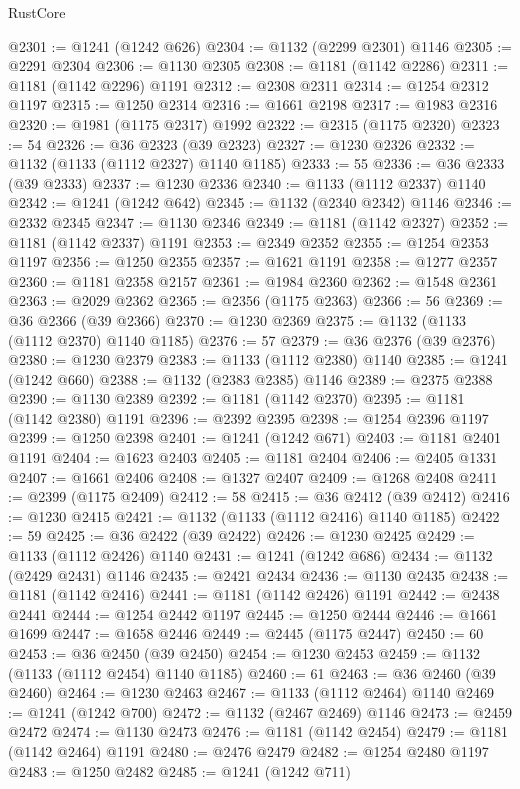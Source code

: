 \begin{lexlean}{RustCore}
\begin{coremodule}
@2301 := @1241 (@1242 @626)
@2304 := @1132 (@2299 @2301) @1146
@2305 := @2291 @2304
@2306 := @1130 @2305
@2308 := @1181 (@1142 @2286)
@2311 := @1181 (@1142 @2296) @1191
@2312 := @2308 @2311
@2314 := @1254 @2312 @1197
@2315 := @1250 @2314
@2316 := @1661 @2198
@2317 := @1983 @2316
@2320 := @1981 (@1175 @2317) @1992
@2322 := @2315 (@1175 @2320)
@2323 := 54
@2326 := @36 @2323 (@39 @2323)
@2327 := @1230 @2326
@2332 := @1132 (@1133 (@1112 @2327) @1140 @1185)
@2333 := 55
@2336 := @36 @2333 (@39 @2333)
@2337 := @1230 @2336
@2340 := @1133 (@1112 @2337) @1140
@2342 := @1241 (@1242 @642)
@2345 := @1132 (@2340 @2342) @1146
@2346 := @2332 @2345
@2347 := @1130 @2346
@2349 := @1181 (@1142 @2327)
@2352 := @1181 (@1142 @2337) @1191
@2353 := @2349 @2352
@2355 := @1254 @2353 @1197
@2356 := @1250 @2355
@2357 := @1621 @1191
@2358 := @1277 @2357
@2360 := @1181 @2358 @2157
@2361 := @1984 @2360
@2362 := @1548 @2361
@2363 := @2029 @2362
@2365 := @2356 (@1175 @2363)
@2366 := 56
@2369 := @36 @2366 (@39 @2366)
@2370 := @1230 @2369
@2375 := @1132 (@1133 (@1112 @2370) @1140 @1185)
@2376 := 57
@2379 := @36 @2376 (@39 @2376)
@2380 := @1230 @2379
@2383 := @1133 (@1112 @2380) @1140
@2385 := @1241 (@1242 @660)
@2388 := @1132 (@2383 @2385) @1146
@2389 := @2375 @2388
@2390 := @1130 @2389
@2392 := @1181 (@1142 @2370)
@2395 := @1181 (@1142 @2380) @1191
@2396 := @2392 @2395
@2398 := @1254 @2396 @1197
@2399 := @1250 @2398
@2401 := @1241 (@1242 @671)
@2403 := @1181 @2401 @1191
@2404 := @1623 @2403
@2405 := @1181 @2404
@2406 := @2405 @1331
@2407 := @1661 @2406
@2408 := @1327 @2407
@2409 := @1268 @2408
@2411 := @2399 (@1175 @2409)
@2412 := 58
@2415 := @36 @2412 (@39 @2412)
@2416 := @1230 @2415
@2421 := @1132 (@1133 (@1112 @2416) @1140 @1185)
@2422 := 59
@2425 := @36 @2422 (@39 @2422)
@2426 := @1230 @2425
@2429 := @1133 (@1112 @2426) @1140
@2431 := @1241 (@1242 @686)
@2434 := @1132 (@2429 @2431) @1146
@2435 := @2421 @2434
@2436 := @1130 @2435
@2438 := @1181 (@1142 @2416)
@2441 := @1181 (@1142 @2426) @1191
@2442 := @2438 @2441
@2444 := @1254 @2442 @1197
@2445 := @1250 @2444
@2446 := @1661 @1699
@2447 := @1658 @2446
@2449 := @2445 (@1175 @2447)
@2450 := 60
@2453 := @36 @2450 (@39 @2450)
@2454 := @1230 @2453
@2459 := @1132 (@1133 (@1112 @2454) @1140 @1185)
@2460 := 61
@2463 := @36 @2460 (@39 @2460)
@2464 := @1230 @2463
@2467 := @1133 (@1112 @2464) @1140
@2469 := @1241 (@1242 @700)
@2472 := @1132 (@2467 @2469) @1146
@2473 := @2459 @2472
@2474 := @1130 @2473
@2476 := @1181 (@1142 @2454)
@2479 := @1181 (@1142 @2464) @1191
@2480 := @2476 @2479
@2482 := @1254 @2480 @1197
@2483 := @1250 @2482
@2485 := @1241 (@1242 @711)

\end{coremodule}
\end{lexlean}

